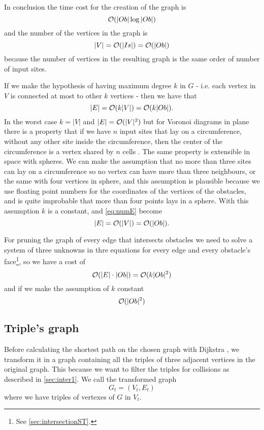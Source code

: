 \documentclass[dissertation.tex]{subfiles}
\begin{document}
In conclusion the time cost for the creation of the graph
is
\newcommand{\eqCostGraph}{\ensuremath{\bigO(|Ob|\log |Ob|)}}
\begin{equation}
  \label{eq:costGraph}
  \eqCostGraph
\end{equation}
and the number of the vertices in the graph
is 
\begin{equation}
  \label{eq:numV}
  |V|=\mathcal{O}(|Is|)=\mathcal{O}(|Ob|)
\end{equation}
because the number of vertices in the resulting graph is the
same order of number of input sites.

If we make the hypothesis of having maximum degree $k$ in $G$ -
i.e. each vertex in $V$ is connected at most to other $k$ vertices -
then we have that
\begin{equation}
  \label{eq:numE}
  |E|=\mathcal{O}(k|V|)=\mathcal{O}(k|Ob|).
\end{equation}
In the worst case $k=|V|$ and $|E|=\mathcal{O}(|V|^2)$ but for Voronoi
diagrams in plane there is a property that if we have $n$ input sites
that lay on a circumference, without any other site inside the
circumference, then the center of the circumference is a vertex shared
by $n$ cells \cite{deberg}. The same property is extensible in space with
spheres. We can make the assumption that no more than three sites can lay
on a circumference so no vertex can have more than three neighbours,
or the same with four vertices in sphere, and this assumption is
plausible because we use floating point numbers for the coordinates of
the vertices of the obstacles, and is quite improbable that more than
four points lays in a sphere. With this assumption $k$ is a constant,
and \cref{eq:numE} become
\begin{equation*}
  |E|=\mathcal{O}(|V|)=\mathcal{O}(|Ob|).
\end{equation*}

For pruning the graph of every edge that intersects obstacles we need
to solve a system of three unknowns in thre equations for every edge
and every obstacle's face\footnote{See \cref{sec:intersectionST}.}, so
we have a cost of
\newcommand{\eqCostPruning}{\ensuremath{\bigO(k|Ob|^2)}}
\begin{equation}
  \label{eq:costPruning}
  \bigO(|E|\cdot|Ob|)=\eqCostPruning
\end{equation}
and if we make the assumption of $k$ constant
\begin{equation*}
  \mathcal{O}(|Ob|^2)
\end{equation*}

\subsection{Triple's graph}\label{sec:trigraph}
Before calculating the shortest path on the chosen graph with Dijkstra
\cite{dijkstra}\cite{knuth}, we
transform it in a graph containing all the triples
of three adjacent vertices in the original graph. This because we want
to filter the triples for collisions as described in
\cref{sec:inter1}. We call the transformed graph
$$G_t=(V_t,E_t)$$
where we have triples of vertexes of $G$ in $V_t$.
\end{document}
